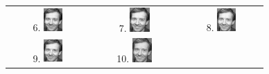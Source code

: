 \documentclass[10pt,a4paper]{article}
\begin{document}
\begin{figure}[h!]
\begin{tabular}{ c c c }
    6. \includegraphics[width=0.25\textwidth]{PartialReconstruction6.jpg} & 7. \includegraphics[width=0.25\textwidth]{PartialReconstruction7.jpg} & 8. \includegraphics[width=0.25\textwidth]{PartialReconstruction8.jpg} \\
    9. \includegraphics[width=0.25\textwidth]{PartialReconstruction9.jpg} & 10. \includegraphics[width=0.25\textwidth]{PartialReconstruction10.jpg}
  \end{tabular}
\end{figure}
\end{document}
